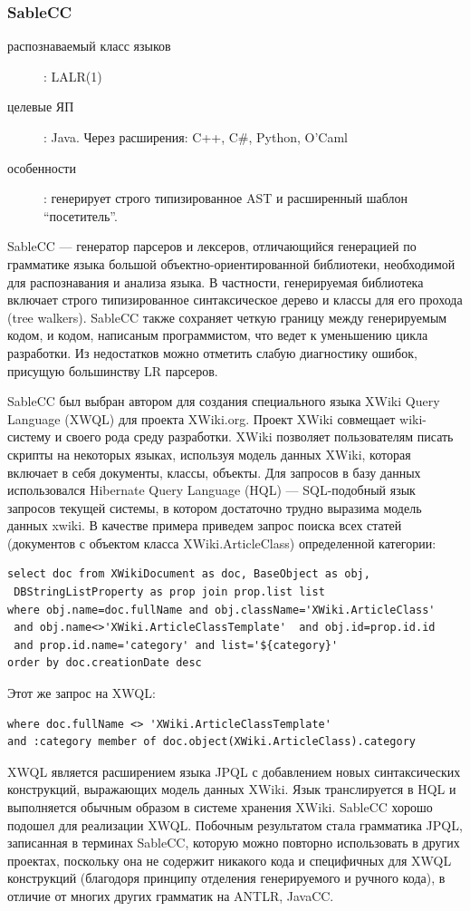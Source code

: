 \documentclass[a4paper,12pt]{article}
\begin{document}
\subsubsection*{SableCC}
\begin{description}
  \item[распознаваемый класс языков]: LALR(1)
  \item[целевые ЯП]: Java. Через расширения: C++, C\#, Python, O'Caml
  \item[особенности]: генерирует строго типизированное AST и расширенный
 	шаблон ``посетитель''.
\end{description}

SableCC --- генератор парсеров и лексеров, отличающийся генерацией по
грамматике языка большой объектно-ориентированной библиотеки, необходимой для
распознавания и анализа языка.
В частности, генерируемая библиотека включает строго типизированное
синтаксическое дерево и классы для его прохода (tree walkers). SableCC
также сохраняет четкую границу между генерируемым кодом, и кодом, написаным
программистом, что ведет к уменьшению цикла разработки. Из недостатков можно
отметить слабую диагностику ошибок, присущую большинству LR парсеров.

SableCC был выбран автором для создания специального языка XWiki Query Language
(XWQL) \cite{xwql} для проекта XWiki.org. Проект XWiki совмещает wiki-систему и
своего рода среду разработки. XWiki позволяет пользователям писать скрипты на
некоторых языках, используя модель данных XWiki, которая включает в себя
документы, классы, объекты. Для запросов в базу данных использовался Hibernate
Query Language (HQL) --- SQL-подобный язык запросов текущей системы, в котором
достаточно трудно выразима модель данных xwiki. В качестве примера приведем
запрос поиска всех статей (документов с объектом класса XWiki.ArticleClass)
определенной категории:
\begin{verbatim}
select doc from XWikiDocument as doc, BaseObject as obj, 
 DBStringListProperty as prop join prop.list list
where obj.name=doc.fullName and obj.className='XWiki.ArticleClass' 
 and obj.name<>'XWiki.ArticleClassTemplate'  and obj.id=prop.id.id
 and prop.id.name='category' and list='${category}'
order by doc.creationDate desc
\end{verbatim}
Этот же запрос на XWQL:
\begin{verbatim}
where doc.fullName <> 'XWiki.ArticleClassTemplate' 
and :category member of doc.object(XWiki.ArticleClass).category
\end{verbatim}
XWQL является расширением языка JPQL \cite{jpql} с добавлением
новых синтаксических конструкций, выражающих модель данных XWiki. Язык
транслируется в HQL и выполняется обычным образом в системе хранения XWiki.
SableCC хорошо подошел для реализации XWQL. Побочным результатом стала
грамматика JPQL, записанная в терминах SableCC, которую можно повторно
использовать в других проектах, поскольку она не содержит никакого кода и
специфичных для XWQL конструкций (благодоря принципу отделения генерируемого и
ручного кода), в отличие от многих других грамматик на ANTLR, JavaCC.
\end{document}

